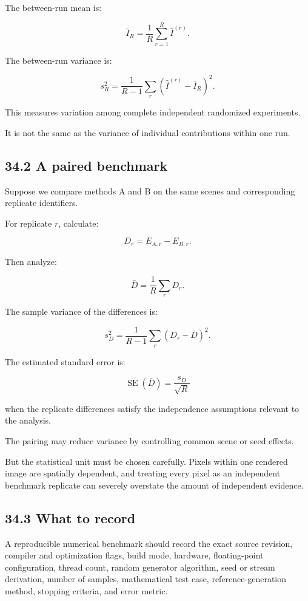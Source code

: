 The between-run mean is:

\[ \bar I_R= \frac1R\sum_{r=1}^{R}\widehat I^{(r)}. \]

The between-run variance is:

\[ s_R^2= \frac1{R-1} \sum_r(\widehat I^{(r)}-\bar I_R)^2. \]

This measures variation among complete independent randomized experiments.

It is not the same as the variance of individual contributions within one run.

\subsection{34.2 A paired benchmark}\label{02-foundations-ii-ch031-a-paired-benchmark}

Suppose we compare methods A and B on the same scenes and corresponding replicate identifiers.

For replicate \(r\), calculate:

\[ D_r=E_{A,r}-E_{B,r}. \]

Then analyze:

\[ \bar D= \frac1R\sum_rD_r. \]

The sample variance of the differences is:

\[ s_D^2= \frac1{R-1}\sum_r(D_r-\bar D)^2. \]

The estimated standard error is:

\[ \boxed{ \operatorname{SE}(\bar D) = \frac{s_D}{\sqrt R} } \]

when the replicate differences satisfy the independence assumptions relevant to the analysis.

The pairing may reduce variance by controlling common scene or seed effects.

But the statistical unit must be chosen carefully. Pixels within one rendered image are spatially dependent, and treating every pixel as an independent benchmark replicate can severely overstate the amount of independent evidence.

\subsection{34.3 What to record}\label{02-foundations-ii-ch031-what-to-record}

A reproducible numerical benchmark should record the exact source revision, compiler and optimization flags, build mode, hardware, floating-point configuration, thread count, random generator algorithm, seed or stream derivation, number of samples, mathematical test case, reference-generation method, stopping criteria, and error metric.

